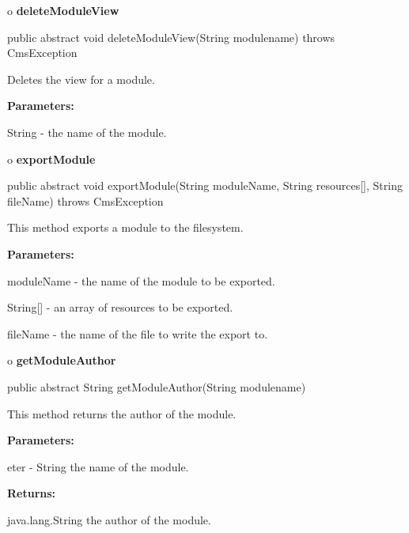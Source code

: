 o {\bf deleteModuleView} 

\begin{PRE}
 public abstract void deleteModuleView(String modulename) throws CmsException
\end{PRE}

\begin{description}
\htmlDD Deletes the view for a module. 

\begin{description}
\item {\bf Parameters:}  

String - the name of the module.  
\end{description}

\end{description}

o {\bf exportModule} 

\begin{PRE}
 public abstract void exportModule(String moduleName,
                                   String resources[],
                                   String fileName) throws CmsException
\end{PRE}

\begin{description}
\htmlDD This method exports a module to the filesystem. 

\begin{description}
\item {\bf Parameters:}  

moduleName - the name of the module to be exported.  

String[] - an array of resources to be exported.  

fileName - the name of the file to write the export to.  
\end{description}

\end{description}

o {\bf getModuleAuthor} 

\begin{PRE}
 public abstract String getModuleAuthor(String modulename)
\end{PRE}

\begin{description}
\htmlDD This method returns the author of the module. 

\begin{description}
\item {\bf Parameters:}  

eter - String the name of the module.  
\item {\bf Returns:}  

java.lang.String the author of the module.  
\end{description}

\end{description}

